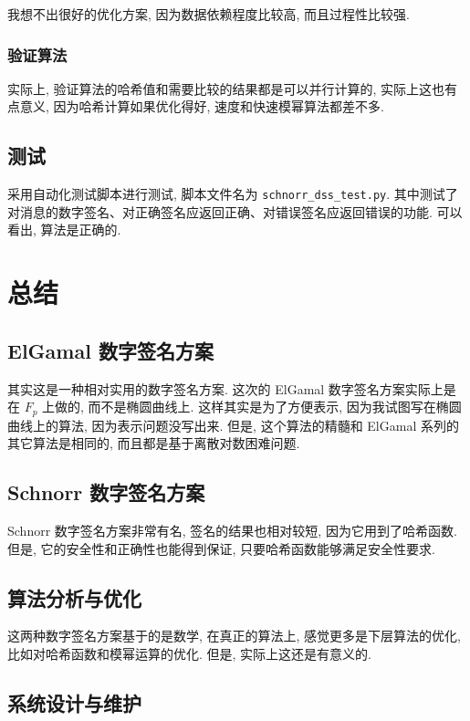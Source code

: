 \documentclass[12pt,a4paper]{article}
\begin{document}
我想不出很好的优化方案, 因为数据依赖程度比较高, 而且过程性比较强. 

\subsubsection*{验证算法}

实际上, 验证算法的哈希值和需要比较的结果都是可以并行计算的, 实际上这也有点意义, 因为哈希计算如果优化得好, 速度和快速模幂算法都差不多. 

\subsection*{测试}

采用自动化测试脚本进行测试, 脚本文件名为 \verb|schnorr_dss_test.py|. 其中测试了对消息的数字签名、对正确签名应返回正确、对错误签名应返回错误的功能. 可以看出, 算法是正确的. 

\section*{总结}

\subsection*{ElGamal 数字签名方案}

其实这是一种相对实用的数字签名方案. 这次的 ElGamal 数字签名方案实际上是在 $ F_p $ 上做的, 而不是椭圆曲线上. 这样其实是为了方便表示, 因为我试图写在椭圆曲线上的算法, 因为表示问题没写出来. 但是, 这个算法的精髓和 ElGamal 系列的其它算法是相同的, 而且都是基于离散对数困难问题. 

\subsection*{Schnorr 数字签名方案}

Schnorr 数字签名方案非常有名, 签名的结果也相对较短, 因为它用到了哈希函数. 但是, 它的安全性和正确性也能得到保证, 只要哈希函数能够满足安全性要求. 

\subsection*{算法分析与优化}

这两种数字签名方案基于的是数学, 在真正的算法上, 感觉更多是下层算法的优化, 比如对哈希函数和模幂运算的优化. 但是, 实际上这还是有意义的.  

\subsection*{系统设计与维护}
\end{document}
